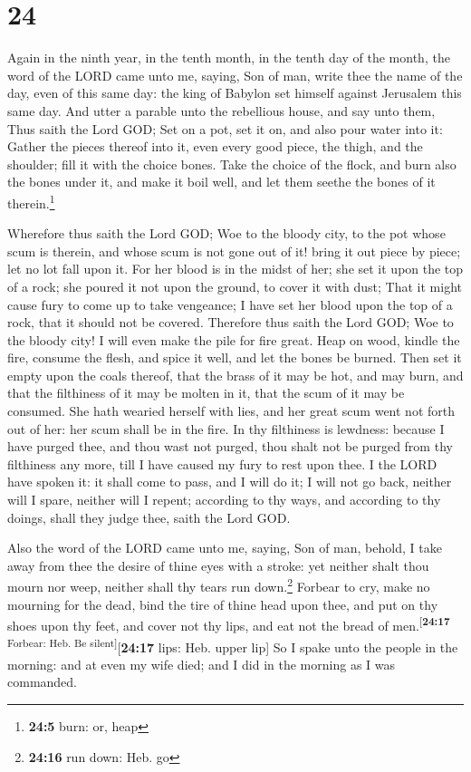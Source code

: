 \hypertarget{section-23}{%
\section{24}\label{section-23}}

 Again in the ninth year, in the tenth month, in the tenth
day of the month, the word of the LORD came unto me, saying,
 Son of man, write thee the name of the day, even of this
same day: the king of Babylon set himself against Jerusalem this same
day.  And utter a parable unto the rebellious house, and
say unto them, Thus saith the Lord GOD; Set on a pot, set it on, and
also pour water into it:  Gather the pieces thereof into
it, even every good piece, the thigh, and the shoulder; fill it with the
choice bones.  Take the choice of the flock, and burn also
the bones under it, and make it boil well, and let them seethe the bones
of it therein.\footnote{\textbf{24:5} burn: or, heap}

 Wherefore thus saith the Lord GOD; Woe to the bloody
city, to the pot whose scum is therein, and whose scum is not gone out
of it! bring it out piece by piece; let no lot fall upon it.
 For her blood is in the midst of her; she set it upon the
top of a rock; she poured it not upon the ground, to cover it with dust;
 That it might cause fury to come up to take vengeance; I
have set her blood upon the top of a rock, that it should not be
covered.  Therefore thus saith the Lord GOD; Woe to the
bloody city! I will even make the pile for fire great. 
Heap on wood, kindle the fire, consume the flesh, and spice it well, and
let the bones be burned.  Then set it empty upon the
coals thereof, that the brass of it may be hot, and may burn, and that
the filthiness of it may be molten in it, that the scum of it may be
consumed.  She hath wearied herself with lies, and her
great scum went not forth out of her: her scum shall be in the fire.
 In thy filthiness is lewdness: because I have purged
thee, and thou wast not purged, thou shalt not be purged from thy
filthiness any more, till I have caused my fury to rest upon thee.
 I the LORD have spoken it: it shall come to pass, and I
will do it; I will not go back, neither will I spare, neither will I
repent; according to thy ways, and according to thy doings, shall they
judge thee, saith the Lord GOD.

 Also the word of the LORD came unto me, saying,
 Son of man, behold, I take away from thee the desire of
thine eyes with a stroke: yet neither shalt thou mourn nor weep, neither
shall thy tears run down.\footnote{\textbf{24:16} run down: Heb. go}
 Forbear to cry, make no mourning for the dead, bind the
tire of thine head upon thee, and put on thy shoes upon thy feet, and
cover not thy lips, and eat not the bread of
men.\textsuperscript{{[}\textbf{24:17} Forbear: Heb. Be
silent{]}}{[}\textbf{24:17} lips: Heb. upper lip{]}  So I
spake unto the people in the morning: and at even my wife died; and I
did in the morning as I was commanded.

